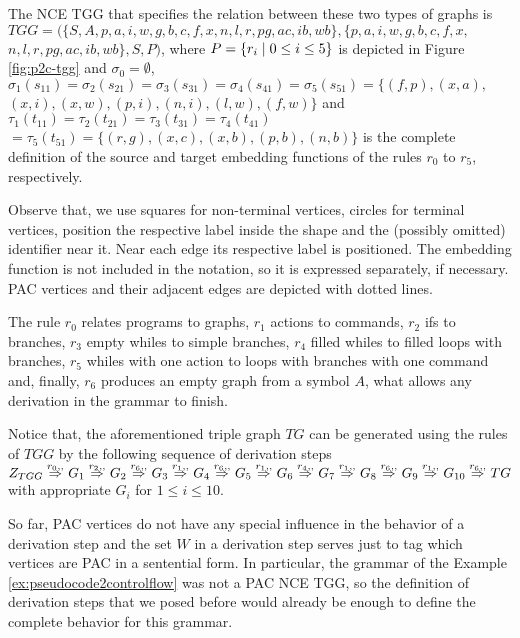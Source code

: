 \documentclass[a4paper,twoside]{article}
\begin{document}
\begin{example}
	The NCE TGG that specifies the relation between these two types of graphs is $TGG = (\{S, A, p, a, i, w, g, b, c, f, x, n, l, r, pg, ac, ib, wb\}, \{p, a, i, w, g, b, c, f, x,$ $ n, l, r, pg, ac, ib, wb\}, S, P)$, where $P = \{r_i \; | \; 0 \le i \le 5\}$ is depicted in Figure \ref{fig:p2c-tgg} and $\sigma_0 = \emptyset$, $\sigma_1(s_{11}) = \sigma_2(s_{21}) = \sigma_3(s_{31}) = \sigma_4(s_{41}) =\sigma_5(s_{51}) = \{ (f,p), (x,a), $ $(x,i), (x,w), (p,i), (n,i), (l,w), (f,w) \}$ and $\tau_1(t_{11}) = \tau_2(t_{21}) = \tau_3(t_{31}) = \tau_4(t_{41}) $ $= \tau_5(t_{51}) = \{ (r,g), (x,c), (x,b), (p,b), (n,b)\}$ is the complete definition of the source and target embedding functions of the rules $r_0$ to $r_5$, respectively.
	
	Observe that, we use squares for non-terminal vertices, circles for terminal vertices, position the respective label inside the shape and the (possibly omitted) identifier near it. Near each edge its respective label is positioned. The embedding function is not included in the notation, so it is expressed separately, if necessary. PAC vertices and their adjacent edges are depicted with dotted lines.
	
	The rule $r_0$ relates programs to graphs, $r_1$ actions to commands, $r_2$ ifs to branches, $r_3$ empty whiles to simple branches, $r_4$ filled whiles to filled loops with branches, $r_5$ whiles with one action to loops with branches with one command and, finally, $r_6$ produces an empty graph from a symbol $A$, what allows any derivation in the grammar to finish.

	\begin{figure*}
		\centering
		
		\caption{The depiction of the rules $r_0$ to $r_6$ of the TGG for the transformation between $Pseudocode$ and $Controlflow$ graphs.}
		\label{fig:p2c-tgg}
	\end{figure*}
	
	Notice that, the aforementioned triple graph $TG$ can be generated using the rules of $TGG$ by the following sequence of derivation steps
	$
	Z_{TGG} \overset{r_0,,}{\Rightarrow}_{} G_1 \overset{r_2,,}{\Rightarrow}_{} G_2 \overset{r_6,,}{\Rightarrow}_{} G_3 \overset{r_1,,}{\Rightarrow}_{} G_4 \overset{r_6,,}{\Rightarrow}_{} G_5 \overset{r_1,,}{\Rightarrow}_{} G_6 \overset{r_4,,}{\Rightarrow}_{} G_7 \overset{r_1,,}{\Rightarrow}_{} G_8 \overset{r_6,,}{\Rightarrow}_{} G_9 \overset{r_1,,}{\Rightarrow}_{} G_{10} \overset{r_6,,}{\Rightarrow}_{} TG
	$
	with appropriate $G_i$ for $1 \le i \le 10$.
\end{example}

So far, PAC vertices do not have any special influence in the behavior of a derivation step and the set $W$ in a derivation step serves just to tag which vertices are PAC in a sentential form. In particular, the grammar of the Example \ref{ex:pseudocode2controlflow} was not a PAC NCE TGG, so the definition of derivation steps that we posed before would already be enough to define the complete behavior for this grammar.
\end{document}
